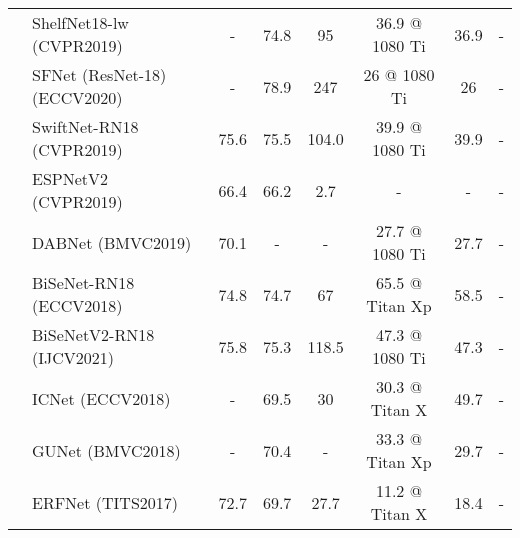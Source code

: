 \begin{table*}[tb]
\begin{tabular}{@{}clcccccZ@{}}
 & ShelfNet18-lw (CVPR2019)~\cite{zhuang2019shelfnet}     & - &      74.8     & 95        & 36.9 @ 1080 Ti  & 36.9               &      -           \\
 & SFNet (ResNet-18) (ECCV2020)~\cite{zhuang2019shelfnet}     & - &      78.9     & 247        & 26 @ 1080 Ti  & 26               &      -           \\
 & SwiftNet-RN18 (CVPR2019)~\cite{orsic_defense_2019}     & 75.6 &      75.5     & 104.0        & 39.9 @ 1080 Ti  & 39.9               &      -           \\
  & ESPNetV2 (CVPR2019)~\cite{mehta2019espnetv2}     & 66.4 & 66.2          & 2.7        & -  & -               &      -           \\
 & DABNet (BMVC2019)~\cite{li2019dabnet}  & 70.1 &      -     & -        & 27.7 @ 1080 Ti  & 27.7               &      -           \\
 & BiSeNet-RN18 (ECCV2018)~\cite{ferrari_bisenet_2018}     & 74.8 &    74.7        & 67       & 65.5 @ Titan Xp & 58.5               &        -       \\
 & BiSeNetV2-RN18 (IJCV2021)~\cite{yu2021bisenet}     & 75.8 &    75.3        & 118.5       & 47.3 @ 1080 Ti & 47.3               &        -       \\
 & ICNet (ECCV2018)~\cite{ferrari_icnet_2018}                     &   -   & 69.5          &   30          & 30.3 @ Titan X  & 49.7               &   -               \\
 & GUNet (BMVC2018)~\cite{mazzini2018guided}                     &    -  & 70.4          &   -          & 33.3 @ Titan Xp  & 29.7               &   -               \\
 & ERFNet (TITS2017)~\cite{romera_erfnet_2018}                       & 72.7 &    69.7       & 27.7         & 11.2 @ Titan X  & 18.4                   &      -            \\ 

\bottomrule

\end{tabular}
\end{table*}



